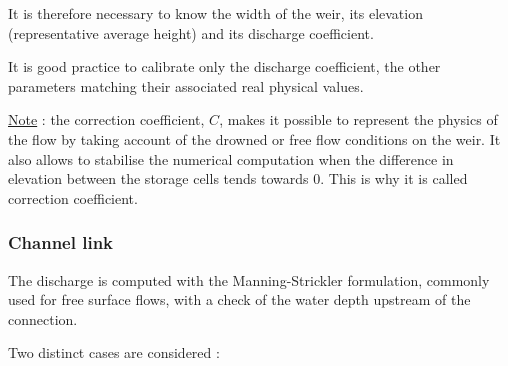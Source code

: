\vspace{0.5cm}

It is therefore necessary to know the width of the weir, its elevation (representative average height) and its discharge coefficient.

\vspace{0.5cm}

It is good practice to calibrate only the discharge coefficient, the other parameters matching their associated real physical values.

\vspace{0.5cm}

\underline{Note} : the correction coefficient, $C$, makes it possible to represent the physics of the flow by taking account of the drowned or free flow conditions on the weir. It also allows to stabilise the numerical computation when the difference in elevation between the storage cells tends towards $0$. This is why it is called correction coefficient.



\subsubsection{Channel link}

The discharge is computed with the Manning-Strickler formulation, commonly used for free surface flows, with a check of the water depth upstream of the connection.

\vspace{0.5cm}

Two distinct cases are considered :

